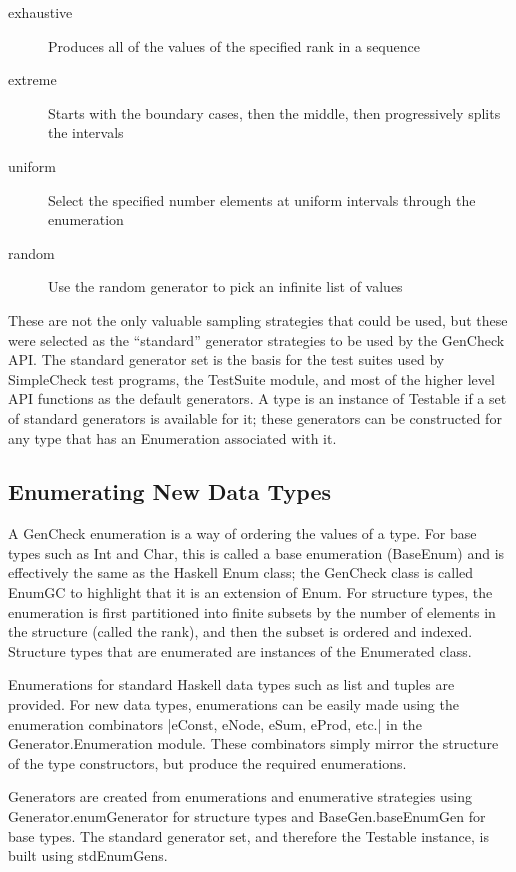 \begin{description}
\item[exhaustive] {Produces all of the values of the specified rank in a sequence}
\item[extreme]{Starts with the boundary cases, then the middle, then progressively splits the intervals}
\item[uniform]{Select the specified number elements at uniform intervals through the enumeration}
\item[random]{Use the random generator to pick an infinite list of values}
\end{description}

These are not the only valuable sampling strategies that could be used, but these were
selected as the ``standard'' generator strategies to be used by the GenCheck API.
The standard generator set is the basis for the test suites used by SimpleCheck test programs,
the TestSuite module, and most of the higher level API functions as the default generators.
A type is an instance of Testable if a set of standard generators is available for it;
these generators can be constructed for any type that has an Enumeration associated with it. 

\subsection{Enumerating New Data Types}
A GenCheck enumeration is a way of ordering the values of a type.
For base types such as Int and Char, this is called a base enumeration (BaseEnum)
and is effectively the same as the Haskell Enum class;
the GenCheck class is called EnumGC to highlight that it is an extension of Enum.
For structure types, the enumeration is first partitioned into finite subsets
by the number of elements in the structure (called the rank),
and then the subset is ordered and indexed.
Structure types that are enumerated are instances of the Enumerated class.

Enumerations for standard Haskell data types such as list and tuples are provided.
For new data types, enumerations can be easily made using the enumeration combinators 
|eConst, eNode, eSum, eProd, etc.| in the Generator.Enumeration module.
These combinators simply mirror the structure of the type constructors,
but produce the required enumerations.



Generators are created from enumerations and enumerative strategies
using Generator.enumGenerator for structure types and BaseGen.baseEnumGen for base types.
The standard generator set, and therefore the Testable instance, is built using stdEnumGens.

